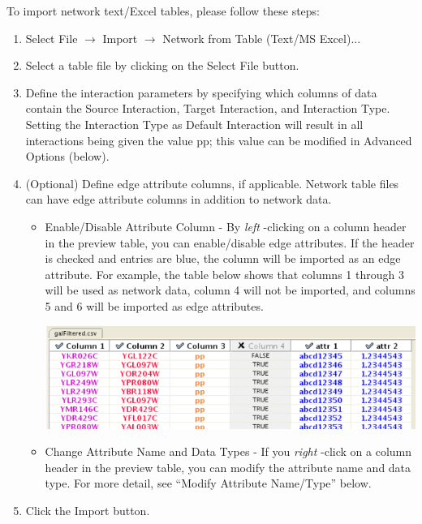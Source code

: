  To import network text/Excel tables, please follow these steps: 
\begin{enumerate}
\item 

 Select File $\rightarrow$ Import $\rightarrow$ Network from Table (Text/MS Excel)... 

\item Select a table file by clicking on the Select File button. 
\item Define the interaction parameters by specifying which columns of data contain the Source Interaction, Target Interaction, and Interaction Type. Setting the Interaction Type as Default Interaction will result in all interactions being given the value pp; this value can be modified in Advanced Options (below). 
\item (Optional) Define edge attribute columns, if applicable. Network table files can have edge attribute columns in addition to network data. \begin{itemize}
\item 

 Enable/Disable Attribute Column - By \emph{left}
-clicking on a column header in the preview table, you can enable/disable edge attributes. If the header is checked and entries are blue, the column will be imported as an edge attribute. For example, the table below shows that columns 1 through 3 will be used as network data, column 4 will not be imported, and columns 5 and 6 will be imported as edge attributes. 
\begin{center}
 
\includegraphics[wdith=\textwidth]{images/network_table_sample.png} 
\end{center}

\item 

 Change Attribute Name and Data Types - If you \emph{right}
-click on a column header in the preview table, you can modify the attribute name and data type. For more detail, see ``Modify Attribute Name/Type'' below. 

\end{itemize}
\item Click the Import button. 
\end{enumerate}

